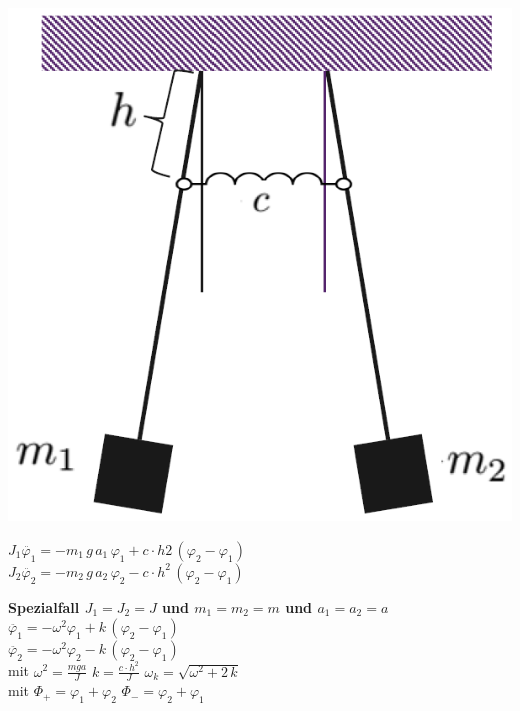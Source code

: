 \begin{minipage}{0.3\linewidth}
    \includegraphics[width=0.95\linewidth]{Bilder/Wellen-Optik/gekoppelte_pendel} 
\end{minipage}
\hfill
\begin{minipage}{0.66\linewidth}
    $ J_1 \ddot{\varphi_1} = -m_1 \, g \, a_1 \, \varphi_1 + c \cdot h2 \, (\varphi_2 - \varphi_1)$ \\
    $ J_2 \ddot{\varphi_2} = -m_2 \, g \,  a_2 \, \varphi_2 - c \cdot h^2 \, (\varphi_2 - \varphi_1)$ \\

    \vspace{0.2cm}

    \textbf{Spezialfall $J_1 = J_2 = J$ und $m_1 = m_2 = m$ und $a_1 = a_2 = a$} \\

    $ \ddot{\varphi_1} = - \omega^2 \varphi_1 + k \, (\varphi_2 - \varphi_1)$ \\
    $ \ddot{\varphi_2} = - \omega^2 \varphi_2 - k \, (\varphi_2 - \varphi_1)$ \\

    \vspace{0.2cm}
    mit $ \omega^2 = \frac{mga}{J}$ \quad $k = \frac{c \cdot h^2}{J}$ \quad $\omega_k = \sqrt{\omega^2 + 2 \, k}$ \\
    
    mit $\Phi_+ = \varphi_1 + \varphi_2$ \qquad $\Phi_- = \varphi_2 + \varphi_1$ \\
\end{minipage}


